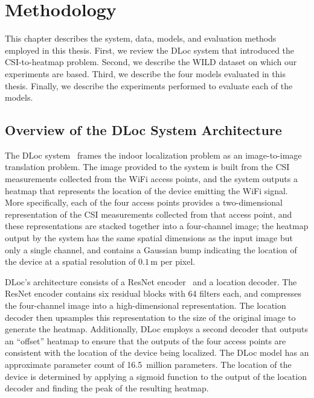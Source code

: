 \chapter{Methodology}
\label{ch:methodology}

This chapter describes the system, data, models, and evaluation methods employed in this thesis. First,
we review the DLoc system that introduced the CSI-to-heatmap problem. Second, we describe the WILD
dataset on which our experiments are based. Third, we describe the four models evaluated in this thesis.
Finally, we describe the experiments performed to evaluate each of the models.

\section{Overview of the DLoc System Architecture}
\label{sec:method:dloc}

The DLoc system~\cite{ayyalasomayajula2020deep} frames the indoor localization problem as an
image-to-image translation problem. The image provided to the system is built from the CSI measurements
collected from the WiFi access points, and the system outputs a heatmap that represents the location of
the device emitting the WiFi signal. More specifically, each of the four access points provides a
two-dimensional representation of the CSI measurements collected from that access point, and these
representations are stacked together into a four-channel image; the heatmap output by the system has the
same spatial dimensions as the input image but only a single channel, and contains a Gaussian bump
indicating the location of the device at a spatial resolution of $0.1$\,m per pixel.

DLoc's architecture consists of a ResNet encoder~\cite{he2016resnet} and a location decoder. The ResNet
encoder contains six residual blocks with 64 filters each, and compresses the four-channel image into a
high-dimensional representation. The location decoder then upsamples this representation to the size of
the original image to generate the heatmap. Additionally, DLoc employs a second decoder that outputs an
``offset'' heatmap to ensure that the outputs of the four access points are consistent with the location
of the device being localized. The DLoc model has an approximate parameter count of 16.5~million
parameters. The location of the device is determined by applying a sigmoid function to the output of the
location decoder and finding the peak of the resulting heatmap.

